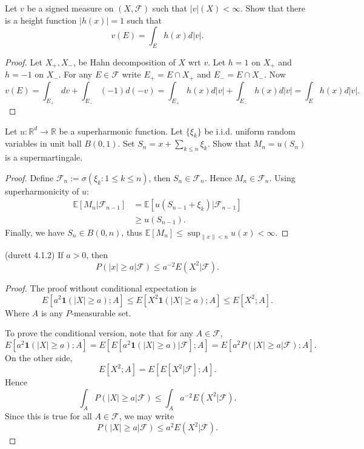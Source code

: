 \begin{problem}
	Let $v$ be a signed measure on $(X, \mathcal{F})$ such that $|v|(X) < \infty $. Show that there is a height function $|h(x)| = 1$ such that
	\[
		v(E) = \int _E h(x) d |v|
	.\] 
\end{problem}
\begin{proof}
	 Let $X_+, X_-$, be Hahn decomposition of $X$ wrt $v$. Let $h = 1$ on $X_+$ and $h = -1$ on $X_-$. For any  $E \in \mathcal{F}$ write $E_+ = E \cap X_+$ and $E_- = E \cap X_-$. Now
	 \[
	 	v(E) = \int _{E_+} d v + \int _{E_-} (-1) d(-v) = \int _{E_+} h(x) d|v| + \int _{E_-} h(x) d |v| = \int _E h(x) d |v|
	 .\] 
\end{proof}

\begin{problem}
	Let $u: \mathbb{R}^d \to  \mathbb{R}$ be a superharmonic function. Let $\{\xi_k\} $ be i.i.d. uniform random variables in unit ball $B(0,1)$. Set $S_n = x + \sum_{k \le n} \xi_k$. Show that $M_n = u(S_n)$ is a supermartingale.
\end{problem}
\begin{proof}
	Define $\mathcal{F}_n := \sigma\left( \xi_k: 1 \le k \le n \right) $, then $S_n \in \mathcal{F}_n$. Hence $M_n \in \mathcal{F}_n$. Using superharmonicity of $u$:
	\begin{align*}
		\mathbb{E}\left[ M_n | \mathcal{F}_{n-1} \right] 
		&= \mathbb{E}\left[ u(S_{n-1} + \xi_k) | \mathcal{F}_{n-1} \right]  \\
		&\ge u(S_{n-1})
	.\end{align*}
	Finally, we have $S_n \in B(0,n)$, thus $\mathbb{E}[M_n] \le \sup_{\|x\|<n} u(x) < \infty $.
\end{proof}

\begin{problem} (durett 4.1.2)
	If $a > 0$, then
	\[
		P\left( |x| \ge a | \mathcal{F} \right) 
		\le a^{-2} E\left( X^2 | \mathcal{F} \right) 
	.\] 
\end{problem}
\begin{proof}
	The proof without conditional expectation is
	 \[
		 E\left[ a^2 \mathbf{1}\left(|X| \ge a\right) ; A\right] 
		 \le E\left[ X^2 \mathbf{1}\left( |X| \ge a \right) ; A  \right] 
		 \le E[X^2 ; A]
	.\] 
	Where $A$ is any $P$-measurable set.

	To prove the conditional version, note that for any $A \in \mathcal{F}$,
	\[
		E\left[ a^2 \mathbf{1}\left( |X| \ge a \right) ; A \right] 
		= E\left[ E\left[ a^2 \mathbf{1}\left( |X| \ge a \right) | \mathcal{F} \right] ; A \right] 
		= E\left[ a^2 P\left( |X| \ge a | \mathcal{F} \right)  ;A\right] 
	.\] 
	On the other side,
	\[
		E\left[ X^2 ; A \right] 
		= E\left[ E\left[ X^2 | \mathcal{F} \right] ;A \right] 
	.\] 
	Hence
	\[
		\int _A P\left( |X| \ge a | \mathcal{F} \right) 
		\le \int _A a^{-2} E\left( X^2 | \mathcal{F} \right) 
	.\] 
	Since this is true for all $A \in \mathcal{F}$, we may write
	\[
		P\left( |X| \ge  a | \mathcal{F} \right) 
		\le a^2 E\left( X^2 | \mathcal{F} \right) 
	.\] 
\end{proof}

